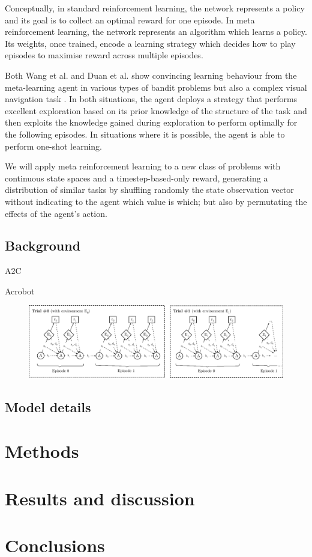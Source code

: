 \documentclass[letterpaper]{article}
\begin{document}
Conceptually, in standard reinforcement learning, the network represents 
a policy and its goal is to collect an optimal reward for one episode. In
meta reinforcement learning, the network represents an algorithm which
learns a policy. Its weights, once trained, encode a learning strategy which
decides how to play episodes to maximise reward across multiple episodes.

Both Wang et al. and Duan et al. show convincing learning behaviour from
the meta-learning agent in various types of bandit problems but also
a complex visual navigation task \citep{learningtonavigate}. In both situations, 
the agent deploys a strategy that performs excellent exploration based on its 
prior knowledge of the structure of the task 
and then exploits the knowledge gained during exploration to perform 
optimally for the following episodes. In situations where it is possible, the
agent is able to perform one-shot learning.

We will apply meta reinforcement learning to a new class of problems with
continuous state spaces and a timestep-based-only reward, generating 
a distribution of similar tasks by shuffling randomly the state observation
vector without indicating to the agent which value is which; but also
by permutating the effects of the agent's action.


\subsection{Background} 
A2C

Acrobot

\begin{figure}[h]
	\centering
	\includegraphics[width=\textwidth]{fig/meta_learning_process.eps}
	\caption{}
	\label{fig:meta_learning_process}
\end{figure}

\subsection{Model details}

\section{Methods}

\section{Results and discussion}

\section{Conclusions}
\cite{tensorflow}

\footnotesize


\end{document}
